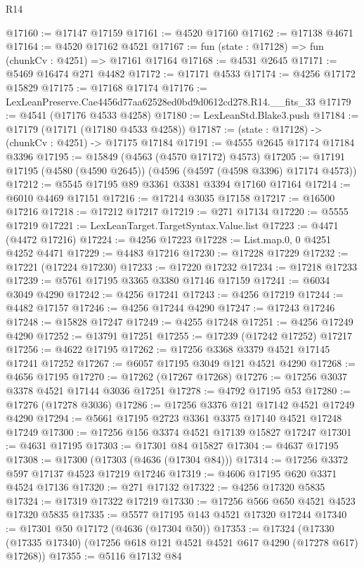 \begin{lexlean}{R14}
\begin{coremodule}
@17160 := @17147 @17159
@17161 := @4520 @17160
@17162 := @17138 @4671
@17164 := @4520 @17162 @4521
@17167 := fun (state : @17128) => fun (chunkCv : @4251) => @17161 @17164
@17168 := @4531 @2645
@17171 := @5469 @16474 @271 @4482
@17172 := @17171 @4533
@17174 := @4256 @17172 @15829
@17175 := @17168 @17174
@17176 := LexLeanPreserve.Cae4456d77aa62528ed0bd9d0612cd278.R14.__fits_33
@17179 := @4541 (@17176 @4533 @4258)
@17180 := LexLeanStd.Blake3.push
@17184 := @17179 (@17171 (@17180 @4533 @4258))
@17187 := (state : @17128) -> (chunkCv : @4251) -> @17175 @17184
@17191 := @4555 @2645 @17174 @17184 @3396
@17195 := @15849 (@4563 (@4570 @17172) @4573)
@17205 := @17191 @17195 (@4580 (@4590 @2645)) (@4596 (@4597 (@4598 @3396) @17174 @4573))
@17212 := @5545 @17195 @89 @3361 @3381 @3394 @17160 @17164
@17214 := @6010 @4469 @17151
@17216 := @17214 @3035 @17158
@17217 := @16500 @17216
@17218 := @17212 @17217
@17219 := @271 @17134
@17220 := @5555 @17219
@17221 := LexLeanTarget.TargetSyntax.Value.list
@17223 := @4471 (@4472 @17216)
@17224 := @4256 @17223
@17228 := List.map.{0, 0} @4251 @4252 @4471
@17229 := @4483 @17216
@17230 := @17228 @17229
@17232 := @17221 (@17224 @17230)
@17233 := @17220 @17232
@17234 := @17218 @17233
@17239 := @5761 @17195 @3365 @3380 @17146 @17159
@17241 := @6034 @3049 @4290
@17242 := @4256 @17241
@17243 := @4256 @17219
@17244 := @4482 @17157
@17246 := @4256 @17244 @4290
@17247 := @17243 @17246
@17248 := @15828 @17247
@17249 := @4255 @17248
@17251 := @4256 @17249 @4290
@17252 := @13791 @17251
@17255 := @17239 (@17242 @17252) @17217
@17256 := @4622 @17195
@17262 := @17256 @3368 @3379 @4521 @17145 @17241 @17252
@17267 := @6057 @17195 @3049 @121 @4521 @4290
@17268 := @4656 @17195
@17270 := @17262 (@17267 @17268)
@17276 := @17256 @3037 @3378 @4521 @17144 @3036 @17251
@17278 := @4792 @17195 @53
@17280 := @17276 (@17278 @3036)
@17286 := @17256 @3376 @121 @17142 @4521 @17249 @4290
@17294 := @5661 @17195 @2723 @3361 @3375 @17140 @4521 @17248 @17249
@17300 := @17256 @156 @3374 @4521 @17139 @15827 @17247
@17301 := @4631 @17195
@17303 := @17301 @84 @15827
@17304 := @4637 @17195
@17308 := @17300 (@17303 (@4636 (@17304 @84)))
@17314 := @17256 @3372 @597 @17137 @4523 @17219 @17246
@17319 := @4606 @17195 @620 @3371 @4524 @17136
@17320 := @271 @17132
@17322 := @4256 @17320 @5835
@17324 := @17319 @17322 @17219
@17330 := @17256 @566 @650 @4521 @4523 @17320 @5835
@17335 := @5577 @17195 @143 @4521 @17320 @17244
@17340 := @17301 @50 @17172 (@4636 (@17304 @50))
@17353 := @17324
    (@17330 (@17335 @17340) (@17256 @618 @121 @4521 @4521 @617 @4290 (@17278 @617) @17268))
@17355 := @5116 @17132 @84

\end{coremodule}
\end{lexlean}
